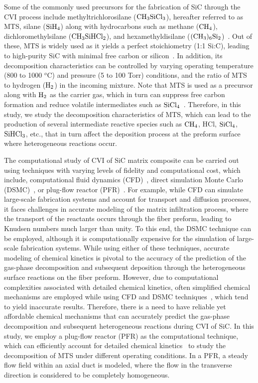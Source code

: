 \documentclass[final, letterpaper, square, comma, numbers, sort&compress]{elsarticle}
\begin{document}
Some of the commonly used precursors for the fabrication of SiC through the CVI process include methyltrichlorosilane ($\rm CH_3SiCl_3$), hereafter referred to as MTS, silane ($\rm SiH_4$) along with hydrocarbons such as methane ($\rm CH_4$), dichloromethylsilane ($\rm CH_3SiHCl_2$), and hexamethyldisilane ($\rm (CH_3)_6Si_2$)~\cite{Noda1992,Naslain2006,Lazzeri2012}. Out of these, MTS is widely used as it yields a perfect stoichiometry (1:1 Si:C), leading to high-purity SiC with minimal free carbon or silicon~\cite{Lamon2005}. In addition, its decomposition characteristics can be controlled by varying operating temperature (800 to 1000 $^o$C) and pressure (5 to 100 Torr) conditions, and the ratio of MTS to hydrogen ($\rm H_2$) in the incoming mixture. Note that MTS is used as a precursor along with $\rm H_2$ as the carrier gas, which in turn can suppress free carbon formation and reduce volatile intermediates such as $\rm SiCl_4$~\cite{Lazzeri2012}. Therefore, in this study, we study the decomposition characteristics of MTS, which can lead to the production of several intermediate reactive species such as $\rm CH_4$, HCl, $\rm SiCl_4$, $\rm SiHCl_3$, etc., that in turn affect the deposition process at the preform surface where heterogeneous reactions occur.

The computational study of CVI of SiC matrix composite can be carried out using techniques with varying levels of fidelity and computational cost, which include, computational fluid dynamics (CFD)~\cite{Streitwieser2006,Ramadan2018,Cha2022,Ramanuj2022}, direct simulation Monte Carlo (DSMC)~\cite{Deck2013,Deck2012}, or plug-flow reactor (PFR)~\cite{Dang2022}. For example, while CFD can simulate large-scale fabrication systems and account for transport and diffusion processes, it faces challenges in accurate modeling of the matrix infiltration process, where the transport of the reactants occurs through the fiber preform, leading to Knudsen numbers much larger than unity. To this end, the DSMC technique can be employed, although it is computationally expensive for the simulation of large-scale fabrication systems. While using either of these techniques, accurate modeling of chemical kinetics is pivotal to the accuracy of the prediction of the gas-phase decomposition and subsequent deposition through the heterogeneous surface reactions on the fiber preform. However, due to computational complexities associated with detailed chemical kinetics, often simplified chemical mechanisms are employed while using CFD and DSMC techniques~\cite{Deck2012,Mollick2017,Ogawa2023}, which tend to yield inaccurate results. Therefore, there is a need to have reliable yet affordable chemical mechanisms that can accurately predict the gas-phase decomposition and subsequent heterogeneous reactions during CVI of SiC. In this study, we employ a plug-flow reactor (PFR) as the computational technique, which can efficiently account for detailed chemical kinetics~\cite{Papasouliotis1994,Roman1995,Bammidipati1996,Norinaga2008} to study the decomposition of MTS under different operating conditions. In a PFR, a steady flow field within an axial duct is modeled, where the flow in the transverse direction is considered to be completely homogeneous.
\end{document}
